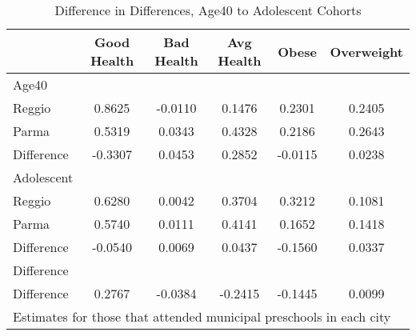 \begin{table}[htbp]\centering
\caption{Difference in Differences, Age40 to Adolescent Cohorts}
\begin{tabular}{l*{5}{c}}
\hline\hline
            & Good Health&  Bad Health&  Avg Health&       Obese&  Overweight\\
\hline
Age40       &            &            &            &            &            \\
Reggio      &      0.8625&     -0.0110&      0.1476&      0.2301&      0.2405\\
Parma       &      0.5319&      0.0343&      0.4328&      0.2186&      0.2643\\
Difference  &     -0.3307&      0.0453&      0.2852&     -0.0115&      0.0238\\
\hline
Adolescent  &            &            &            &            &            \\
Reggio      &      0.6280&      0.0042&      0.3704&      0.3212&      0.1081\\
Parma       &      0.5740&      0.0111&      0.4141&      0.1652&      0.1418\\
Difference  &     -0.0540&      0.0069&      0.0437&     -0.1560&      0.0337\\
\hline
Difference  &            &            &            &            &            \\
Difference  &      0.2767&     -0.0384&     -0.2415&     -0.1445&      0.0099\\
\hline\hline
\multicolumn{6}{l}{\footnotesize Estimates for those that attended municipal preschools in each city}\\
\end{tabular}
\end{table}
